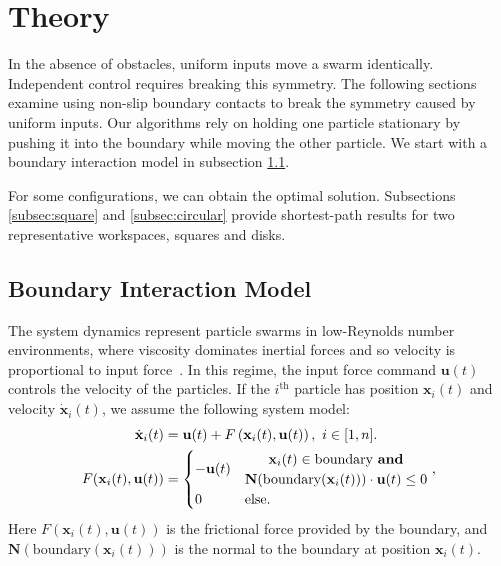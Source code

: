 \section{Theory}
\label{sec:theory}
 In the absence of obstacles, uniform inputs move a swarm identically.  
 Independent control requires breaking this symmetry. 
The following sections examine using non-slip boundary contacts to break the symmetry caused by uniform inputs.  
 Our algorithms rely on holding one particle stationary by pushing it into the boundary while moving the other particle. 
 We start with a boundary interaction model in subsection \ref{subsec:WallFriction}.
 

For some configurations, we can obtain the optimal solution. 
Subsections \ref{subsec:square} and \ref{subsec:circular} provide shortest-path results for two representative workspaces, squares and disks.
\subsection{Boundary Interaction Model}\label{subsec:WallFriction}
 The system dynamics represent particle swarms in low-Reynolds number environments, where viscosity dominates inertial forces and so velocity is proportional to input force~\cite{Purcell1977}. 
 In this regime, the input force command $\mathbf{u}(t)$ controls the velocity of the particles.  
 If the $i^{\textrm{th}}$ particle has position $\mathbf{x}_i(t)$ and velocity $\dot{\mathbf{x}}_i(t)$,  we assume the following system model:
 \begin{align}\label{eq:swarmDynamicsAndFric} 
\dot{\mathbf{x}}_i(t)
 &=
 \mathbf{u}(t)
 +F \left( \mathbf{x}_i(t), \mathbf{u}(t) \right), ~i \in [1,n].\\
 F(\mathbf{x}_i(t), \mathbf{u}(t)) &= \begin{cases}
  - \mathbf{u}(t) &\begin{matrix} \mathbf{x}_i(t) \in  \textrm{boundary \textbf{and}}\\
\mathbf{N}(\textrm{boundary$(\mathbf{x}_i(t))$})\cdot   \mathbf{u}(t) \le 0 \end{matrix}
\textrm{    ,} \\
 0 & \textrm{else}.
 \end{cases}\nonumber
 \end{align}
 Here  $F(\mathbf{x}_i(t), \mathbf{u}(t)) $ is the frictional force provided by the boundary, and
 $\mathbf{N}(\textrm{boundary$(\mathbf{x}_i(t))$})$ is the normal to the boundary at position $\mathbf{x}_i(t)$.
 
